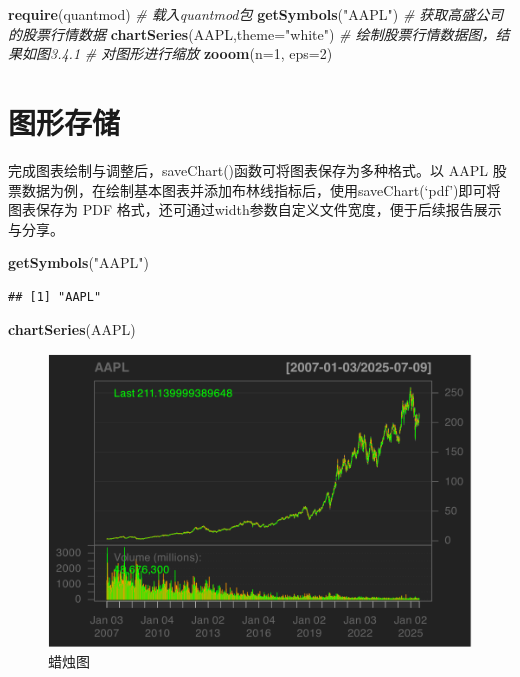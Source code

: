 \documentclass[]{ctexbook}
\newenvironment{Shaded}{\begin{snugshade}}{\end{snugshade}}
\newcommand{\AttributeTok}[1]{\textcolor[rgb]{0.13,0.29,0.53}{#1}}
\newcommand{\CommentTok}[1]{\textcolor[rgb]{0.56,0.35,0.01}{\textit{#1}}}
\newcommand{\DecValTok}[1]{\textcolor[rgb]{0.00,0.00,0.81}{#1}}
\newcommand{\FunctionTok}[1]{\textcolor[rgb]{0.13,0.29,0.53}{\textbf{#1}}}
\newcommand{\NormalTok}[1]{#1}
\newcommand{\StringTok}[1]{\textcolor[rgb]{0.31,0.60,0.02}{#1}}
\begin{document}
\begin{Shaded}
\begin{Highlighting}[]
\FunctionTok{require}\NormalTok{(quantmod) }\CommentTok{\# 载入quantmod包}
\FunctionTok{getSymbols}\NormalTok{(}\StringTok{"AAPL"}\NormalTok{)  }\CommentTok{\# 获取高盛公司的股票行情数据}
\FunctionTok{chartSeries}\NormalTok{(AAPL,}\AttributeTok{theme=}\StringTok{"white"}\NormalTok{)  }\CommentTok{\# 绘制股票行情数据图，结果如图3.4.1}
\CommentTok{\# 对图形进行缩放}
\FunctionTok{zooom}\NormalTok{(}\AttributeTok{n=}\DecValTok{1}\NormalTok{, }\AttributeTok{eps=}\DecValTok{2}\NormalTok{)    }
\end{Highlighting}
\end{Shaded}

\section{图形存储}\label{ux56feux5f62ux5b58ux50a8}

完成图表绘制与调整后，saveChart()函数可将图表保存为多种格式。以 AAPL 股票数据为例，在绘制基本图表并添加布林线指标后，使用saveChart(`pdf')即可将图表保存为 PDF 格式，还可通过width参数自定义文件宽度，便于后续报告展示与分享。

\begin{Shaded}
\begin{Highlighting}[]
\FunctionTok{getSymbols}\NormalTok{(}\StringTok{"AAPL"}\NormalTok{)}
\end{Highlighting}
\end{Shaded}

\begin{verbatim}
## [1] "AAPL"
\end{verbatim}

\begin{Shaded}
\begin{Highlighting}[]
\FunctionTok{chartSeries}\NormalTok{(AAPL)}
\end{Highlighting}
\end{Shaded}

\begin{figure}
\includegraphics[width=0.9\linewidth]{quantmod_files/figure-latex/savePdf-1} \caption{蜡烛图}\label{fig:savePdf-1}
\end{figure}
\end{document}
